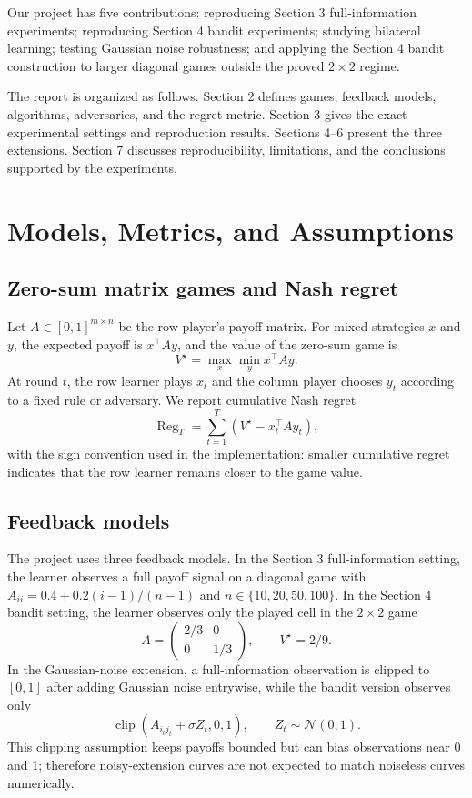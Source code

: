 \documentclass[a4paper,11pt]{article}
\theoremstyle{definition}
\newcommand{\Reg}{\operatorname{Reg}}
\newcommand{\Vstar}{V^\star}
\begin{document}
Our project has five contributions: reproducing Section 3 full-information experiments; reproducing Section 4 bandit experiments; studying bilateral learning; testing Gaussian noise robustness; and applying the Section 4 bandit construction to larger diagonal games outside the proved $2\times2$ regime.

The report is organized as follows. Section 2 defines games, feedback models, algorithms, adversaries, and the regret metric. Section 3 gives the exact experimental settings and reproduction results. Sections 4--6 present the three extensions. Section 7 discusses reproducibility, limitations, and the conclusions supported by the experiments.

\section{Models, Metrics, and Assumptions}

\subsection{Zero-sum matrix games and Nash regret}

Let $A\in[0,1]^{m\times n}$ be the row player's payoff matrix. For mixed strategies $x$ and $y$, the expected payoff is $x^\top A y$, and the value of the zero-sum game is
\[
  \Vstar=\max_x \min_y x^\top A y.
\]
At round $t$, the row learner plays $x_t$ and the column player chooses $y_t$ according to a fixed rule or adversary. We report cumulative Nash regret
\[
  \Reg_T=\sum_{t=1}^T \left(\Vstar - x_t^\top A y_t\right),
\]
with the sign convention used in the implementation: smaller cumulative regret indicates that the row learner remains closer to the game value.

\newpage
\subsection{Feedback models}

The project uses three feedback models. In the Section 3 full-information setting, the learner observes a full payoff signal on a diagonal game with
$A_{ii}=0.4+0.2(i-1)/(n-1)$ and $n\in\{10,20,50,100\}$. In the Section 4 bandit setting, the learner observes only the played cell in the $2\times2$ game
\[
  A=\begin{pmatrix}2/3&0\\0&1/3\end{pmatrix},\qquad \Vstar=2/9.
\]
In the Gaussian-noise extension, a full-information observation is clipped to $[0,1]$ after adding Gaussian noise entrywise, while the bandit version observes only
\[
  \operatorname{clip}\!\left(A_{i_tj_t}+\sigma Z_t,0,1\right),\qquad Z_t\sim\mathcal{N}(0,1).
\]
This clipping assumption keeps payoffs bounded but can bias observations near 0 and 1; therefore noisy-extension curves are not expected to match noiseless curves numerically.
\end{document}
